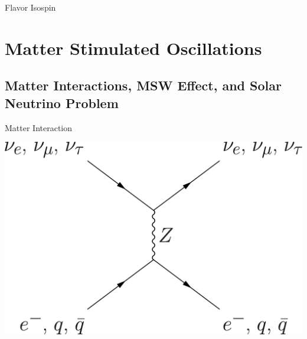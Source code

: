 \documentclass[9pt]{beamer}
\begin{document}
\begin{darkframes}
\begin{frame}{Flavor Isospin}
\end{frame}





\section{Matter Stimulated Oscillations}


\subsection{Matter Interactions, MSW Effect, and Solar Neutrino Problem}


\begin{frame}{Matter Interaction}





\begin{tcolorbox}[sidebyside]
\centering
\centering
\includegraphics[height=0.32\textheight]{assets/neutral-current.png}


\end{tcolorbox}
\end{frame}
\end{darkframes}
\end{document}
